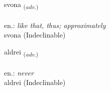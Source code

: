 \documentclass[frontgrid, backgrid]{flacards}\usepackage[]{graphicx}\usepackage[]{xcolor}
\begin{document}
\renewcommand{\flhead}{\vskip5pt \fboxsep=0pt {\small\bfseries\footnotesize Atviksorð | Adverb}}
\renewcommand{\fcfoot}{\vskip5pt \fboxsep=0pt \hspace{2pt}{\small\bfseries\footnotesize 1K}}

\renewcommand{\blhead}{\vskip5pt {\small\bfseries\footnotesize Atviksorð | Adverb }}
\renewcommand{\bcfoot}{\vskip5pt \hspace{2pt}{\small\bfseries\footnotesize 1K}}


{svona \small{\textsubscript{(\textit{adv.})}} \\[1ex]
\textphonetic{[svɔːna]} \\
en.: \emph{like that, thus; approximately} \\  [2ex]
svona (Indeclinable)}


\renewcommand{\flhead}{\vskip5pt \fboxsep=0pt {\small\bfseries\footnotesize Atviksorð | Adverb}}
\renewcommand{\fcfoot}{\vskip5pt \fboxsep=0pt \hspace{2pt}{\small\bfseries\footnotesize 1K}}

\renewcommand{\blhead}{\vskip5pt {\small\bfseries\footnotesize Atviksorð | Adverb }}
\renewcommand{\bcfoot}{\vskip5pt \hspace{2pt}{\small\bfseries\footnotesize 1K}}


{aldrei \small{\textsubscript{(\textit{adv.})}} \\[1ex]
\textphonetic{[altrei]} \\
en.: \emph{never} \\  [2ex]
aldrei (Indeclinable)}

\renewcommand{\flhead}{\vskip5pt \fboxsep=0pt {\small\bfseries\footnotesize Sagnorð | Verb}}
\renewcommand{\fcfoot}{\vskip5pt \fboxsep=0pt \hspace{2pt}{\small\bfseries\footnotesize 1K}}

\renewcommand{\blhead}{\vskip5pt {\small\bfseries\footnotesize Sagnorð | Verb }}
\renewcommand{\bcfoot}{\vskip5pt \hspace{2pt}{\small\bfseries\footnotesize 1K}}
\end{document}
